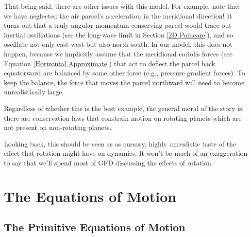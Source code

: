 That being said, there are other issues with this model. For example, note that we have neglected the air parcel's acceleration in the meridional direction! It turns out that a truly angular momentum conserving parcel would trace out inertial oscillations (see the long-wave limit in Section \ref{2D Poincare}), and so oscillate not only east-west but also north-south. In our model, this does not happen, because we implicitly assume that the meridional coriolis forces (see Equation \ref{Horizontal Approximate}) that act to deflect the parcel back equatorward are balanced by some other force (e.g., pressure gradient forces). To keep the balance, the force that moves the parcel northward will need to become unrealistically large.

Regardless of whether this is the best example, the general moral of the story is: there are conservation laws that constrain motion on rotating planets which are not present on non-rotating planets.

Looking back, this should be seen as as cursory, highly unrealistic taste of the effect that rotation might have on dynamics. It won't be much of an exaggeration to say that we'll spend most of GFD discussing the effects of rotation.

\chapter{The Equations of Motion}\label{EoM GFD}

\section{The Primitive Equations of Motion}


